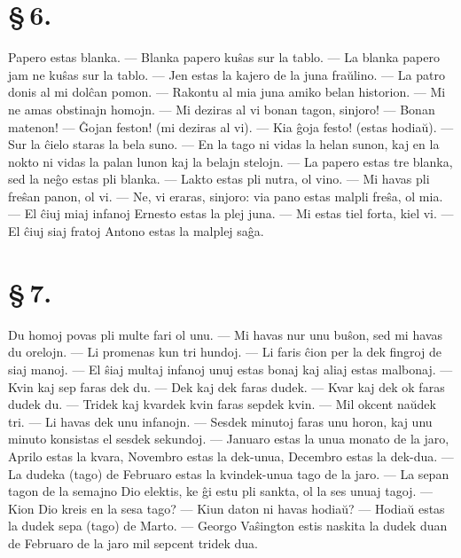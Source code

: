 \section*{\S\,6.}
Papero estas blanka. --- Blanka papero ku\^sas sur la tablo. --- La
blanka papero jam ne ku\^sas sur la tablo. --- Jen estas la kajero
de la juna fra\u ulino. --- La patro donis al mi dol\^can pomon. ---
Rakontu al mia juna amiko belan historion. --- Mi ne amas obstinajn
homojn. --- Mi deziras al vi bonan tagon, sinjoro! --- Bonan
matenon! --- \^Gojan feston! (mi deziras al vi). --- Kia \^goja
festo! (estas hodia\u u). --- Sur la \^cielo staras la bela suno.
--- En la tago ni vidas la helan sunon, kaj en la nokto ni vidas la
palan lunon kaj la belajn stelojn. --- La papero estas tre blanka,
sed la ne\^go estas pli blanka. --- Lakto estas pli nutra, ol vino.
--- Mi havas pli fre\^san panon, ol vi. --- Ne, vi eraras, sinjoro:
via pano estas malpli fre\^sa, ol mia. --- El \^ciuj miaj infanoj
Ernesto estas la plej juna. --- Mi estas tiel forta, kiel vi. --- El
\^ciuj siaj fratoj Antono estas la malplej sa\^ga.

\section*{\S\,7.}
Du homoj povas pli multe fari ol unu. --- Mi havas nur unu bu\^son,
sed mi havas du orelojn. --- Li promenas kun tri hundoj. --- Li
faris \^cion per la dek fingroj de siaj manoj. --- El \^siaj multaj
infanoj unuj estas bonaj kaj aliaj estas malbonaj. --- Kvin kaj sep
faras dek du. --- Dek kaj dek faras dudek. --- Kvar kaj dek ok faras
dudek du. --- Tridek kaj kvardek kvin faras sepdek kvin. --- Mil
okcent na\u udek tri. --- Li havas dek unu infanojn. --- Sesdek
minutoj faras unu horon, kaj unu minuto konsistas el sesdek
sekundoj. --- Januaro estas la unua monato de la jaro, Aprilo estas
la kvara, Novembro estas la dek-unua, Decembro estas la dek-dua.
--- La dudeka (tago) de Februaro estas la kvindek-unua tago de la
jaro. --- La sepan tagon de la semajno Dio elektis, ke \^gi estu pli
sankta, ol la ses unuaj tagoj. --- Kion Dio kreis en la sesa tago?
--- Kiun daton ni havas hodia\u u? --- Hodia\u u estas la dudek sepa
(tago) de Marto. --- Georgo Va\^sington estis naskita la dudek duan
de Februaro de la jaro mil sepcent tridek dua.


